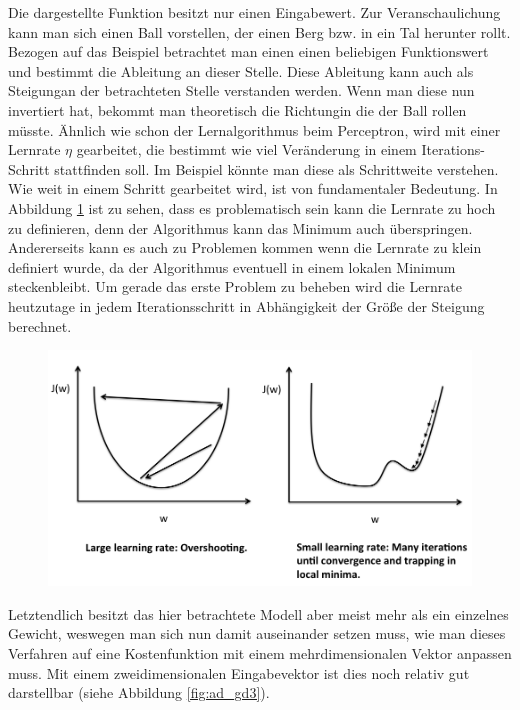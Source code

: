 Die dargestellte Funktion besitzt nur einen Eingabewert. Zur Veranschaulichung kann man sich einen Ball vorstellen, der einen Berg bzw. in ein Tal herunter rollt. Bezogen auf das Beispiel betrachtet man einen einen beliebigen Funktionswert und bestimmt die Ableitung an dieser Stelle. Diese Ableitung kann auch als \glqq Steigung\grqq  an der betrachteten Stelle verstanden werden. Wenn man diese nun invertiert hat, bekommt man theoretisch die \glqq Richtung\grqq  in die der Ball rollen müsste. Ähnlich wie schon der Lernalgorithmus beim Perceptron, wird mit einer Lernrate ${\eta}$ gearbeitet, die bestimmt wie viel Veränderung in einem Iterations-Schritt stattfinden soll. Im Beispiel könnte man diese als Schrittweite verstehen. 
Wie weit in einem Schritt gearbeitet wird, ist von fundamentaler Bedeutung. In Abbildung \ref{fig:ad_gd2} ist zu sehen, dass es problematisch sein kann die Lernrate zu hoch zu definieren, denn der Algorithmus kann das Minimum auch überspringen. Andererseits kann es auch zu Problemen kommen wenn die Lernrate zu klein definiert wurde, da der Algorithmus eventuell in einem lokalen Minimum \glqq steckenbleibt\grqq . Um gerade das erste Problem zu beheben wird die Lernrate heutzutage in jedem Iterationsschritt in Abhängigkeit der Größe der Steigung berechnet.

\begin{figure}[!htb]
	\centering
	\includegraphics[width=\linewidth]{img/adeline_learning_rate}
	\label{fig:ad_gd2}
\end{figure}

Letztendlich besitzt das hier betrachtete Modell aber meist mehr als ein einzelnes Gewicht, weswegen man sich nun damit auseinander setzen muss, wie man dieses Verfahren auf eine Kostenfunktion mit einem mehrdimensionalen Vektor anpassen muss. Mit einem zweidimensionalen Eingabevektor ist dies noch relativ gut darstellbar (siehe Abbildung \ref{fig:ad_gd3}).

